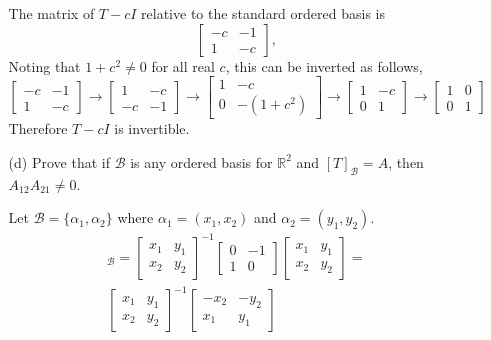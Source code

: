 \documentclass{article}
\begin{document}
\begin{enumerate}[listparindent=\parindent]
\begin{enumerate}[listparindent=\parindent]
            The matrix of \(T - cI\) relative to the standard ordered basis is
            \[ \begin{bmatrix} -c & -1 \\ 1 & -c \end{bmatrix}, \]
            Noting that \(1 + c^2 \neq 0\) for all real \(c\), this can be inverted as follows,
            \[
                \begin{bmatrix} -c & -1 \\ 1 & -c \end{bmatrix} \rightarrow
                \begin{bmatrix} 1 & -c \\ -c & -1 \end{bmatrix} \rightarrow
                \begin{bmatrix} 1 & -c \\ 0 & -(1 + c^2) \end{bmatrix} \rightarrow
                \begin{bmatrix} 1 & -c \\ 0 & 1 \end{bmatrix} \rightarrow
                \begin{bmatrix} 1 & 0 \\ 0 & 1 \end{bmatrix}
            \]
            Therefore \(T - cI\) is invertible.

        \item[(d)] Prove that if \(\mathcal{B}\) is any ordered basis for \(\mathbb{R}^2\)
            and \([T]_\mathcal{B} = A\), then \(A_{12}A_{21} \neq 0\).

            Let \(\mathcal{B} = \{\alpha_1, \alpha_2\}\) where \(\alpha_1 = (x_1, x_2)\) and \(\alpha_2 = (y_1, y_2)\).
            \begin{gather*}
                [T]_\mathcal{B} =
                \begin{bmatrix} x_1 & y_1 \\ x_2 & y_2 \end{bmatrix}^{-1}
                \begin{bmatrix} 0 & -1 \\ 1 & 0 \end{bmatrix}
                \begin{bmatrix} x_1 & y_1 \\ x_2 & y_2 \end{bmatrix}
                = \\
                \begin{bmatrix} x_1 & y_1 \\ x_2 & y_2 \end{bmatrix}^{-1}
                \begin{bmatrix} -x_2 & -y_2 \\ x_1 & y_1 \end{bmatrix}
            \end{gather*}


\end{enumerate}
\end{enumerate}
\end{document}
